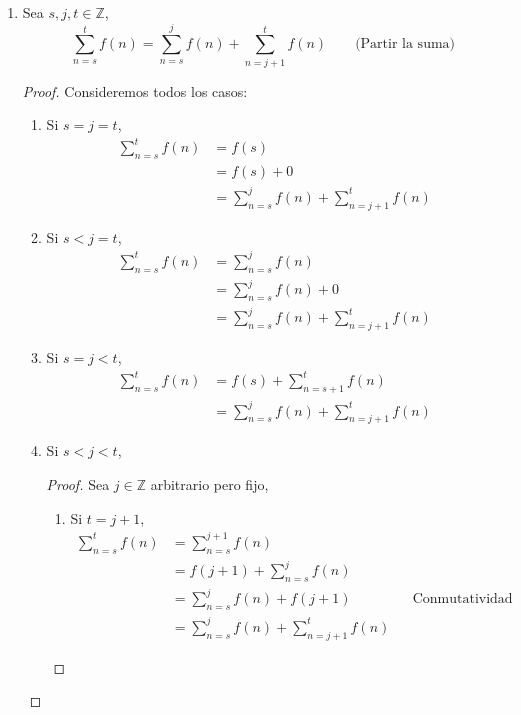 \documentclass[11pt]{article}
\newcommand{\Z}{\mathbb{Z}}
\begin{document}
\begin{enumerate}[label=\alph*)]
  \item Sea $s,j,t\in \Z$, \[\sum_{n=s}^{t}f(n) = \sum_{n=s}^{j}f(n) + \sum_{n=j+1}^{t}f(n) \qquad \text{(Partir la suma)}\]
  \begin{proof}
    Consideremos todos los casos:
    \begin{enumerate}[label=\Roman*)]
      \item Si $s=j=t$,
      \begin{align*}
        \sum_{n=s}^{t}f(n) &= f(s)\\
        &= f(s) + 0\\
        &= \sum_{n=s}^{j}f(n) + \sum_{n=j+1}^{t}f(n)
      \end{align*}
      \item Si $s<j=t$,
      \begin{align*}
        \sum_{n=s}^{t}f(n) &= \sum_{n=s}^{j}f(n)\\
        &= \sum_{n=s}^{j}f(n) + 0\\
        &= \sum_{n=s}^{j}f(n) + \sum_{n=j+1}^{t}f(n)
      \end{align*}
      \item Si $s=j<t$,
      \begin{align*}
        \sum_{n=s}^{t}f(n) &= f(s) + \sum_{n=s+1}^{t}f(n)\\
        &= \sum_{n=s}^{j}f(n) + \sum_{n=j+1}^{t}f(n)
      \end{align*}
      \item Si $s<j<t$,
      \begin{proof}
        Sea $j\in \Z$ arbitrario pero fijo,
        \begin{enumerate}[label=\roman*)]
          \item Si $t=j+1$,
          \begin{align*}
            \sum_{n=s}^{t}f(n) &=  \sum_{n=s}^{j+1}f(n)\\
            &= f(j+1) + \sum_{n=s}^{j}f(n)\\
            &= \sum_{n=s}^{j}f(n) + f(j+1) && \text{Conmutatividad (de la sumatoria)}\\
            &= \sum_{n=s}^{j}f(n) + \sum_{n=j+1}^{t}f(n)
          \end{align*}
        \end{enumerate}
      \end{proof}
    \end{enumerate}
  \end{proof}
    
  \end{enumerate}
\end{document}
